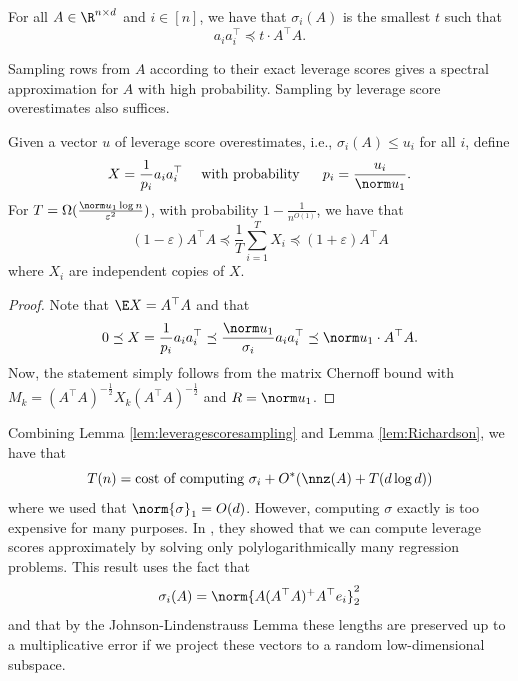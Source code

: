 \begin{lem}
\label{leverage_score_opt_2} For all $A\in\R^{n\times d}$ and $i\in[n]$,
we have that $\sigma_{i}(A)$ is the smallest $t$ such that 
\begin{equation}
a_{i}a_{i}^{\top}\preceq t\cdot A^{\top}A.\label{eq:leverage_score_spectral_upper}
\end{equation}
\end{lem}

Sampling rows from $A$ according to their exact leverage scores gives
a spectral approximation for $A$ with high probability. Sampling
by leverage score overestimates also suffices.
\begin{lem}
\label{lem:leveragescoresampling}Given a vector $u$ of leverage
score overestimates, i.e., $\sigma_{i}(A)\le u_{i}$ for all $i$,
define 
\[
X=\frac{1}{p_{i}}a_{i}a_{i}^{\top}\quad\mbox{ with probability \quad\ }p_{i}=\frac{u_{i}}{\norm u_{1}}.
\]
For $T=\Omega(\frac{\norm u_{1}\log n}{\varepsilon^{2}})$, with probability
$1-\frac{1}{n^{O(1)}}$, we have that
\[
(1-\varepsilon)A^{\top}A\preceq\frac{1}{T}\sum_{i=1}^{T}X_{i}\preceq(1+\varepsilon)A^{\top}A
\]
where $X_{i}$ are independent copies of $X$.
\end{lem}

\begin{proof}
Note that $\E X=A^{\top}A$ and that 
\[
0\preceq X=\frac{1}{p_{i}}a_{i}a_{i}^{\top}\preceq\frac{\norm u_{1}}{\sigma_{i}}a_{i}a_{i}^{\top}\preceq\norm u_{1}\cdot A^{\top}A.
\]
Now, the statement simply follows from the matrix Chernoff bound with
$M_{k}=(A^{\top}A)^{-\frac{1}{2}}X_{k}(A^{\top}A)^{-\frac{1}{2}}$
and $R=\norm u_{1}$.
\end{proof}
Combining Lemma \ref{lem:leveragescoresampling} and Lemma \ref{lem:Richardson},
we have that
\begin{equation}
T(n)=\text{cost of computing }\sigma_{i}+O^{*}(\nnz(A)+T(d\log d))\label{eq:TmnS1}
\end{equation}
where we used that $\norm{\sigma}_{1}=O(d)$. However, computing $\sigma$
exactly is too expensive for many purposes. In \cite{spielman2011graph},
they showed that we can compute leverage scores approximately by solving
only polylogarithmically many regression problems. This result uses
the fact that 
\[
\sigma_{i}(A)=\norm{A(A^{\top}A)^{+}A^{\top}e_{i}}_{2}^{2}
\]
and that by the Johnson-Lindenstrauss Lemma these lengths are preserved
up to a multiplicative error if we project these vectors to a random
low-dimensional subspace.

